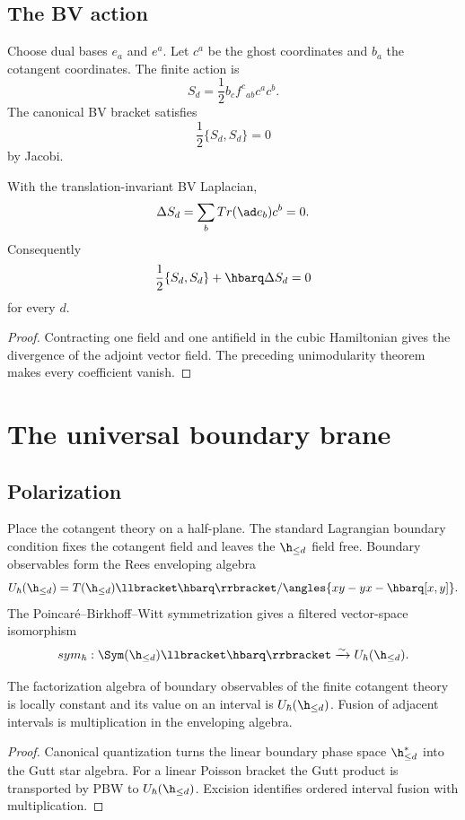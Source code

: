 \section{The BV action}
Choose dual bases $e_a$ and $e^a$.  Let $c^a$ be the ghost coordinates and $b_a$ the cotangent coordinates.  The finite action is
\[
 S_d=\frac12 b_c f^c{}_{ab}c^ac^b.
\]
The canonical BV bracket satisfies
\[
 \frac12\{S_d,S_d\}=0
\]
by Jacobi.

\begin{theorem}
With the translation-invariant BV Laplacian,
\[
 \Delta S_d=\sum_b\Tr(\ad e_b)c^b=0.
\]
Consequently
\[
 \frac12\{S_d,S_d\}+\hbarq\Delta S_d=0
\]
for every $d$.
\end{theorem}
\begin{proof}
Contracting one field and one antifield in the cubic Hamiltonian gives the divergence of the adjoint vector field.  The preceding unimodularity theorem makes every coefficient vanish.
\end{proof}

\chapter{The universal boundary brane}
\section{Polarization}
Place the cotangent theory on a half-plane.  The standard Lagrangian boundary condition fixes the cotangent field and leaves the $\h_{\le d}$ field free.  Boundary observables form the Rees enveloping algebra
\[
 U_\hbar(\h_{\le d})
 =T(\h_{\le d})\llbracket\hbarq\rrbracket/
 \angles{xy-yx-\hbarq[x,y]}.
\]
The Poincar\'e--Birkhoff--Witt symmetrization gives a filtered vector-space isomorphism
\[
 \operatorname{sym}_\hbar:\Sym(\h_{\le d})\llbracket\hbarq\rrbracket
 \xrightarrow{\sim}U_\hbar(\h_{\le d}).
\]

\begin{theorem}
The factorization algebra of boundary observables of the finite cotangent theory is locally constant and its value on an interval is $U_\hbar(\h_{\le d})$.  Fusion of adjacent intervals is multiplication in the enveloping algebra.
\end{theorem}
\begin{proof}
Canonical quantization turns the linear boundary phase space $\h_{\le d}^*$ into the Gutt star algebra.  For a linear Poisson bracket the Gutt product is transported by PBW to $U_\hbar(\h_{\le d})$.  Excision identifies ordered interval fusion with multiplication.
\end{proof}

